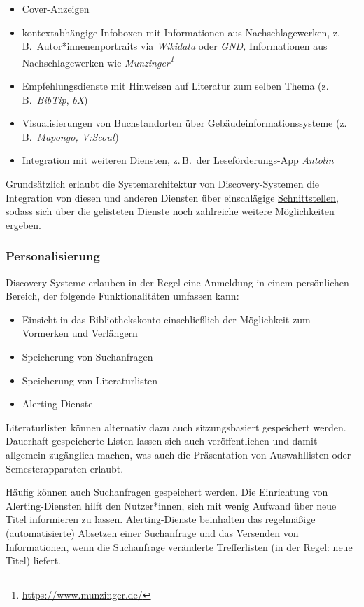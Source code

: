 \documentclass[
  11pt,
  letterpaper,
  DIV=11,
  twoside]{scrreprt}
\DeclareRobustCommand{\href}[2]{#2\footnote{\url{#1}}}
\begin{document}
\begin{itemize}
\item
  Cover-Anzeigen
\item
  kontextabhängige Infoboxen mit Informationen aus Nachschlagewerken,
  z.\,B.~Autor*innenenportraits via \emph{Wikidata} oder \emph{GND,}
  Informationen aus Nachschlagewerken wie
  \emph{\href{https://www.munzinger.de/}{Munzinger}}
\item
  Empfehlungsdienste mit Hinweisen auf Literatur zum selben Thema
  (z.\,B.~\emph{BibTip}, \emph{bX})
\item
  Visualisierungen von Buchstandorten über Gebäudeinformationssysteme
  (z.\,B.~\emph{Mapongo, V:Scout})
\item
  Integration mit weiteren Diensten, z.\,B.~der Leseförderungs-App
  \emph{Antolin}
\end{itemize}

Grundsätzlich erlaubt die Systemarchitektur von Discovery-Systemen die
Integration von diesen und anderen Diensten über einschlägige
\hyperref[schnittstellen]{Schnittstellen}, sodass sich über die
gelisteten Dienste noch zahlreiche weitere Möglichkeiten ergeben.

\subsubsection{Personalisierung}\label{personalisierung}

Discovery-Systeme erlauben in der Regel eine Anmeldung in einem
persönlichen Bereich, der folgende Funktionalitäten umfassen kann:

\begin{itemize}
\item
  Einsicht in das Bibliothekskonto einschließlich der Möglichkeit zum
  Vormerken und Verlängern
\item
  Speicherung von Suchanfragen
\item
  Speicherung von Literaturlisten
\item
  Alerting-Dienste
\end{itemize}

Literaturlisten können alternativ dazu auch sitzungsbasiert gespeichert
werden. Dauerhaft gespeicherte Listen lassen sich auch veröffentlichen
und damit allgemein zugänglich machen, was auch die Präsentation von
Auswahllisten oder Semesterapparaten erlaubt.

Häufig können auch Suchanfragen gespeichert werden. Die Einrichtung von
Alerting-Diensten hilft den Nutzer*innen, sich mit wenig Aufwand über
neue Titel informieren zu lassen. Alerting-Dienste beinhalten das
regelmäßige (automatisierte) Absetzen einer Suchanfrage und das
Versenden von Informationen, wenn die Suchanfrage veränderte
Trefferlisten (in der Regel: neue Titel) liefert.
\end{document}
